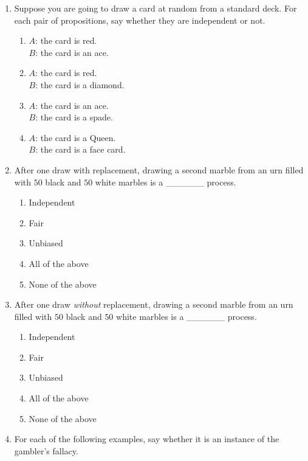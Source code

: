 \documentclass[justified]{tufte-book}
\providecommand{\tightlist}{%
  \setlength{\itemsep}{0pt}\setlength{\parskip}{0pt}}
\theoremstyle{definition}
\theoremstyle{definition}
\theoremstyle{definition}
\theoremstyle{definition}
\theoremstyle{remark}
\begin{document}
\begin{enumerate}
\item
  Suppose you are going to draw a card at random from a standard deck. For each pair of propositions, say whether they are independent or not.

  \begin{enumerate}
  \def\labelenumii{\alph{enumii}.}
  \item
    \(A\): the card is red.\\
    \(B\): the card is an ace.
  \item
    \(A\): the card is red.\\
    \(B\): the card is a diamond.
  \item
    \(A\): the card is an ace.\\
    \(B\): the card is a spade.
  \item
    \(A\): the card is a Queen.\\
    \(B\): the card is a face card.
  \end{enumerate}
\item
  After one draw with replacement, drawing a second marble from an urn filled with \(50\) black and \(50\) white marbles is a \_\_\_\_\_\_ process.

  \begin{enumerate}
  \def\labelenumii{\alph{enumii}.}
  \tightlist
  \item
    Independent
  \item
    Fair
  \item
    Unbiased
  \item
    All of the above
  \item
    None of the above
  \end{enumerate}
\item
  After one draw \emph{without} replacement, drawing a second marble from an urn filled with \(50\) black and \(50\) white marbles is a \_\_\_\_\_\_ process.

  \begin{enumerate}
  \def\labelenumii{\alph{enumii}.}
  \tightlist
  \item
    Independent
  \item
    Fair
  \item
    Unbiased
  \item
    All of the above
  \item
    None of the above
  \end{enumerate}
\item
  For each of the following examples, say whether it is an instance of the gambler's fallacy.


\end{enumerate}
\end{document}
